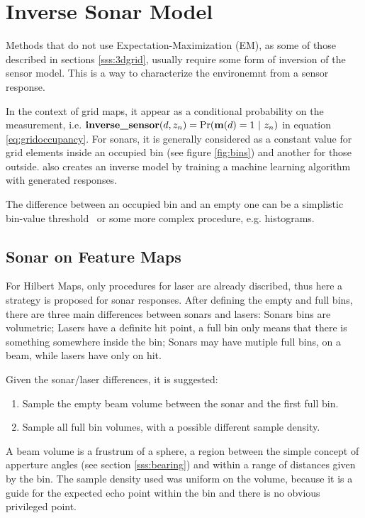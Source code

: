 \section{Inverse Sonar Model}
\label{s:ism}
Methods that do not use Expectation-Maximization (EM), as some of those
described in sections \ref{sss:3dgrid}, usually require some form of inversion
of the sensor model. This is a way to characterize the environemnt from a sensor
response.

In the context of grid maps, it appear as a conditional probability on the
measurement, i.e.
$\text{\textbf{inverse\_sensor}}(d,z_n)=\Pr(\mathrm{\mathbf{m}}(d)=1~|~z_n)$ in equation
\ref{eq:gridoccupancy}. For sonars, it is generally considered as a constant
value for grid elements inside an occupied bin (see figure \ref{fig:bins}) and
another for those outside\cite{thrunprob}. \citet{thrunprob} also creates an
inverse model by training a machine learning algorithm with generated responses.

The difference between an occupied bin and an empty one can be a simplistic
bin-value threshold~\cite{ribas2010underwater,Moravec1985,thrunprob} or some
more complex procedure, e.g. histograms. 

\subsection{Sonar on Feature Maps}
\label{ss:isfm}
For Hilbert Maps, only procedures for
laser are already discribed, thus here a strategy is proposed for sonar
responses. After defining the empty and full bins, there are three main
differences between sonars and lasers: Sonars bins are volumetric; Lasers have a
definite hit point, a full bin only means that there is something somewhere
inside the bin; Sonars may have mutiple full bins, on a beam, while lasers have
only on hit.

Given the sonar/laser differences, it is suggested:
\begin{enumerate}[I]
  \item Sample the empty beam volume between the sonar and the first full bin.
  \item Sample all full bin volumes, with a possible different sample density. 
\end{enumerate}

A beam volume is a frustrum of a sphere, a region between the simple concept of
apperture angles (see section \ref{sss:bearing}) and within a range of distances
given by the bin. The sample density used was uniform on the volume, because
it is a guide for the expected echo point within the bin and there is no obvious
privileged point.


